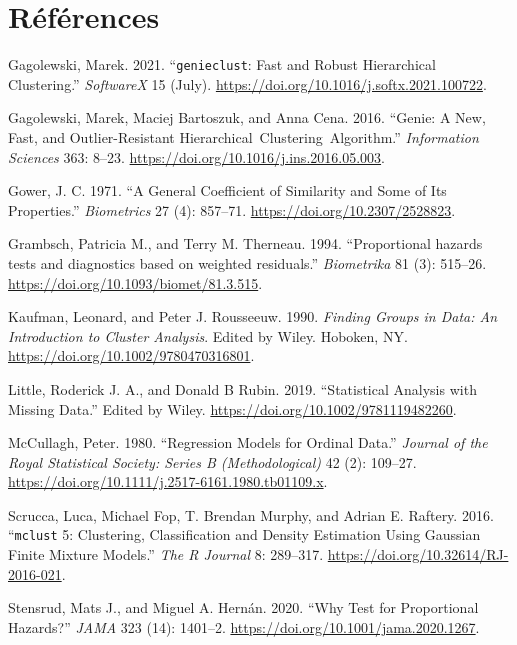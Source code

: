 \documentclass[
  11pt,
  letterpaper,
]{scrbook}
\newlength{\cslhangindent}
\newlength{\cslentryspacingunit} %
\newenvironment{CSLReferences}[2] %
 {%
  \setlength{\parindent}{0pt}
  \ifodd #1
  \let\oldpar\par
  \def\par{\hangindent=\cslhangindent\oldpar}
  \fi
  \setlength{\parskip}{#2\cslentryspacingunit}
 }%
 {}
\theoremstyle{definition}
\theoremstyle{remark}
\begin{document}

\hypertarget{ruxe9fuxe9rences}{%
\chapter*{Références}\label{ruxe9fuxe9rences}}


\hypertarget{refs}{}
\begin{CSLReferences}{1}{0}
\leavevmode{}%
Gagolewski, Marek. 2021. {``\texttt{genieclust}: Fast and Robust
Hierarchical Clustering.''} \emph{SoftwareX} 15 (July).
\url{https://doi.org/10.1016/j.softx.2021.100722}.

\leavevmode{}%
Gagolewski, Marek, Maciej Bartoszuk, and Anna Cena. 2016. {``Genie: A
New, Fast, and Outlier-Resistant Hierarchical~Clustering~Algorithm.''}
\emph{Information Sciences} 363: 8--23.
\url{https://doi.org/10.1016/j.ins.2016.05.003}.

\leavevmode{}%
Gower, J. C. 1971. {``A General Coefficient of Similarity and Some of
Its Properties.''} \emph{Biometrics} 27 (4): 857--71.
\url{https://doi.org/10.2307/2528823}.

\leavevmode{}%
Grambsch, Patricia M., and Terry M. Therneau. 1994. {``{Proportional
hazards tests and diagnostics based on weighted residuals}.''}
\emph{Biometrika} 81 (3): 515--26.
\url{https://doi.org/10.1093/biomet/81.3.515}.

\leavevmode{}%
Kaufman, Leonard, and Peter J. Rousseeuw. 1990. \emph{Finding Groups in
Data: An Introduction to Cluster Analysis}. Edited by Wiley. Hoboken,
NY. \url{https://doi.org/10.1002/9780470316801}.

\leavevmode{}%
Little, Roderick J. A., and Donald B Rubin. 2019. {``Statistical
Analysis with Missing Data.''} Edited by Wiley.
\url{https://doi.org/10.1002/9781119482260}.

\leavevmode{}%
McCullagh, Peter. 1980. {``Regression Models for Ordinal Data.''}
\emph{Journal of the Royal Statistical Society: Series B
(Methodological)} 42 (2): 109--27.
\url{https://doi.org/10.1111/j.2517-6161.1980.tb01109.x}.

\leavevmode{}%
Scrucca, Luca, Michael Fop, T. Brendan Murphy, and Adrian E. Raftery.
2016. {``\texttt{mclust} 5: Clustering, Classification and Density
Estimation Using {G}aussian Finite Mixture Models.''} \emph{The R
Journal} 8: 289--317. \url{https://doi.org/10.32614/RJ-2016-021}.

\leavevmode{}%
Stensrud, Mats J., and Miguel A. Hernán. 2020. {``{Why Test for
Proportional Hazards?}''} \emph{JAMA} 323 (14): 1401--2.
\url{https://doi.org/10.1001/jama.2020.1267}.

\end{CSLReferences}


\backmatter
\end{document}
